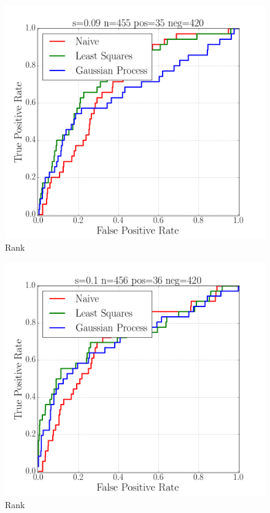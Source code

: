 \begin{figure}[H]
  \centering
    \includegraphics[width=\textwidth]{roc009}
  \caption{Rank}
  \label{fig:Fig3}
\end{figure}

\begin{figure}[H]
  \centering
    \includegraphics[width=\textwidth]{roc01}
  \caption{Rank}
  \label{fig:Fig3}
\end{figure}


